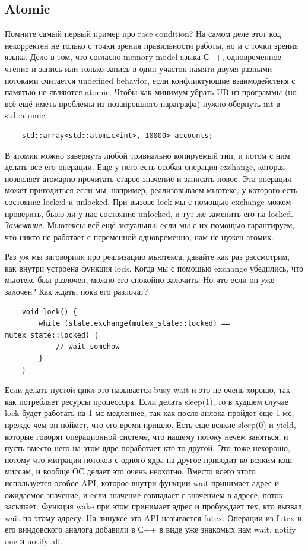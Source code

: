 \documentclass[12pt, a4paper]{article}
\begin{document}
\subsection{Atomic}
Помните самый первый пример про race condition? На самом деле этот код некорректен не только с точки зрения правильности работы, но и с точки зрения языка. Дело в том, что согласно memory model языка С++, одновременное чтение и запись или только запись в один участок памяти двумя разными потоками считается undefined behavior, если конфликтующие взаимодействия с памятью не являются atomic. Чтобы как минимум убрать UB из программы (но всё ещё иметь проблемы из позапрошлого параграфа) нужно обернуть int в std::atomic.
\begin{verbatim}
	std::array<std::atomic<int>, 10000> accounts;
\end{verbatim}
В атомик можно завернуть любой тривиально копируемый тип, и потом с ним делать все его операции. Еще у него есть особая операция exchange, которая позволяет атомарно прочитать старое значение и записать новое. Эта операция может пригодиться если мы, например, реализовываем мьютекс, у которого есть состояние locked и unlocked. При вызове lock мы с помощью exchange можем проверить, было ли у нас состояние unlocked, и тут же заменить его на locked.\\
\textit{Замечание.} Мьютексы всё ещё актуальны: если мы с их помощью гарантируем, что никто не работает с переменной одновременно, нам не нужен атомик.
\par Раз уж мы заговорили про реализацию мьютекса, давайте как раз рассмотрим, как внутри устроена функция lock. Когда мы с помощью exchange убедились, что мьютекс был разлочен, можно его спокойно залочить. Но что если он уже залочен? Как ждать, пока его разлочат?
\begin{verbatim}
	void lock() {
		while (state.exchange(mutex_state::locked) == mutex_state::locked) {
			// wait somehow
		}
	}
\end{verbatim}
Если делать пустой цикл это называется busy wait и это не очень хорошо, так как потребляет ресурсы процессора. Если делать sleep(1), то в худшем случае lock будет работать на 1 мс медленнее, так как после анлока пройдет еще 1 мс, прежде чем он поймет, что его время пришло. Есть еще всякие sleep(0) и yield, которые говорят операционной системе, что нашему потоку нечем заняться, и пусть вместо него на этом ядре поработает кто-то другой. Это тоже нехорошо, потому что миграция потоков с одного ядра на другое приводит ко всяким кэш миссам, и вообще ОС делает это очень неохотно. Вместо всего этого используется особое API, которое внутри функции wait принимает адрес и ожидаемое значение, и если значение совпадает с значением в адресе, поток засыпает. Функция wake при этом принимает адрес и пробуждает тех, кто вызвал wait по этому адресу. На линуксе это API называется futex. Операции из futex и его виндовского аналога добавили в С++ в виде уже знакомых нам wait, notify one и notify all.
\end{document}
